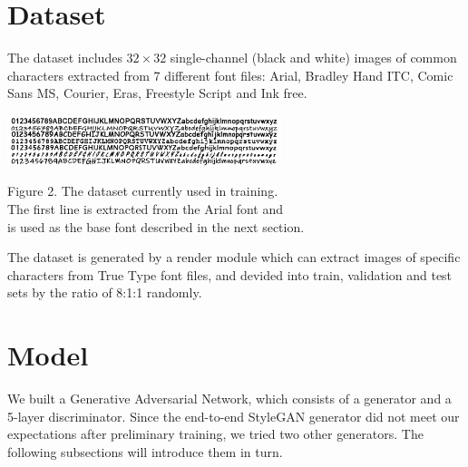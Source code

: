 \documentclass[letterpaper]{article}
\begin{document}
\section{Dataset}
The dataset includes $32 \times 32$ single-channel (black and white) images of common characters extracted from 7 different font files: Arial, Bradley Hand ITC, Comic Sans MS, Courier, Eras, Freestyle Script and Ink free.
\begin{center}
    \includegraphics[width=8cm]{update-fig-dataset.png}

    Figure 2. The dataset currently used in training.\\The first line is extracted from the Arial font and\\is used as the base font described in the next section.
\end{center}
The dataset is generated by a render module which can extract images of specific characters from True Type font files, and devided into train, validation and test sets by the ratio of 8:1:1 randomly.


\section{Model}
We built a Generative Adversarial Network, which consists of a generator and a 5-layer discriminator. Since the end-to-end StyleGAN generator did not meet our expectations after preliminary training, we tried two other generators. The following subsections will introduce them in turn.
\end{document}
